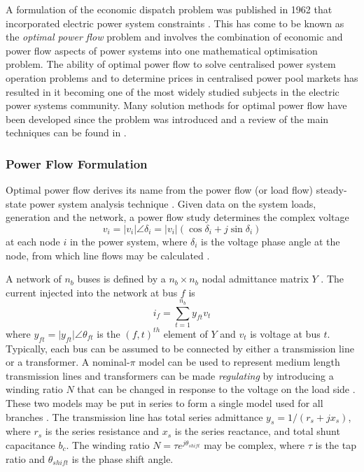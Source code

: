 A formulation of the economic dispatch problem was published in 1962 that
incorporated electric power system constraints \cite{carpentier:opf}. This has
come to be known as the \textit{optimal power flow} problem and involves the
combination of economic and power flow aspects of power systems into one
mathematical optimisation problem.  The ability of optimal power flow to solve
centralised power system operation problems and to determine prices in
centralised power pool markets has resulted in it becoming one of the most
widely studied subjects in the electric power systems community.  Many solution
methods for optimal power flow have been developed since the problem was
introduced and a review of the main techniques can be found in
.

\subsubsection{Power Flow Formulation}
\label{sec:pf_form}
Optimal power flow derives its name from the power flow (or load flow)
steady-state power system analysis technique \cite[\S18]{kallrath:2009}.  Given
data on the system loads, generation and the network, a power flow study
determines the complex voltage
\begin{equation}
\label{eq:ybus}
v_i = \vert v_i \vert \angle\delta_i = \vert
v_i\vert(\cos\delta_i + j\sin\delta_i)
\end{equation}
at each node $i$ in the power system, where $\delta_i$ is the voltage phase
angle at the node, from which line flows may be calculated \cite{wood:pgoc}.

A network of $n_b$ buses is defined by a $n_b \times n_b$ nodal admittance
matrix $Y$ \cite{wood:pgoc,gloversarma:psad}.  The current injected into the
network at bus $f$ is
\begin{equation}
i_f = \sum_{t=1}^{n_b} y_{ft} v_t
\end{equation}
where $y_{ft} = \vert y_{ft}\vert \angle\theta_{ft}$ is the $(f,t)^{th}$
element of $Y$ and $v_t$ is voltage at bus $t$.
Typically, each bus can be assumed to be connected by either a transmission line
or a transformer. A nominal-$\pi$ model can be used to represent medium length
transmission lines \cite{grainger:psa} and transformers can be made
\textit{regulating} by introducing a winding ratio $N$ that can be changed in
response to the voltage on the load side \cite{crow:2009}. These two models may
be put in series to form a single model used for all branches
\cite{zimmerman:matpower}. The transmission line has total series admittance
$y_s = 1/(r_s+jx_s)$, where $r_s$ is the series resistance and $x_s$ is the
series reactance, and total shunt capacitance $b_c$. The winding ratio
$N = \tau e^{j\theta_{shift}}$ may be complex, where $\tau$ is the tap ratio and
$\theta_{shift}$ is the phase shift angle.

